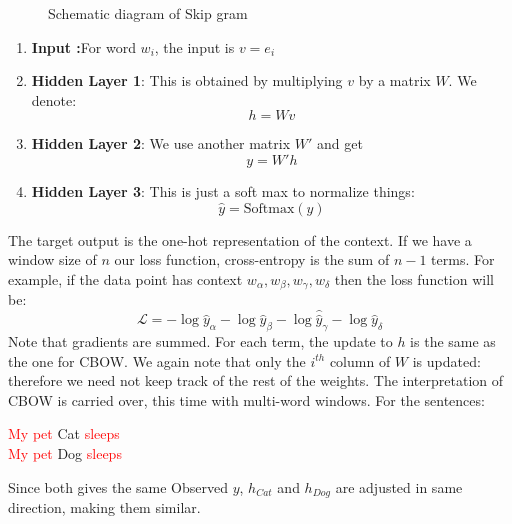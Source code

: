 \begin{figure}[h]
\begin{center}
\begin{tikzpicture}[x=0.75pt,y=0.75pt,yscale=-1,xscale=1]
\end{tikzpicture}

\caption{Schematic diagram of Skip gram}
    \end{center}
\end{figure}
\begin{enumerate}
    \item \textbf{Input :}For word $w_i$, the input is $v=e_i$
    \item  \textbf{Hidden Layer 1}: This is obtained by multiplying $v$ by a matrix $W$. We denote:
    $$h=Wv$$
    \item \textbf{Hidden Layer 2}: We use another matrix $W'$ and get
    $$y=W'h$$
    \item \textbf{Hidden Layer 3}: This is just a soft max to normalize things:
    $$\hat y=\text{Softmax}(y)$$
\end{enumerate}
The target output is  the one-hot representation of the context.
If we have a window size of $n$ our loss function, cross-entropy is the sum of $n-1$ terms. For example, if the data point has context $w_\alpha,w_\beta,w_\gamma,w_\delta$ then the loss function will be:
$$\mathcal L=- \log \hat y_\alpha- \log \hat y_\beta- \log \hat \hat y_\gamma- \log \hat y_\delta$$
Note that gradients are summed. For each term, the update to $h$ is the same as the one for CBOW. We again note that only the $i^{th}$ column of $W$ is updated: therefore we need not keep track of the rest of the weights. The interpretation of CBOW is carried over, this time with multi-word windows. For the sentences:
\begin{center}
    \textcolor{red}{My pet} Cat \textcolor{red}{sleeps}\\
    \textcolor{red}{My pet} Dog \textcolor{red}{sleeps}
\end{center}
Since both gives the same Observed $y$, $h_{Cat}$ and $h_{Dog}$ are adjusted in same direction, making them similar. 

